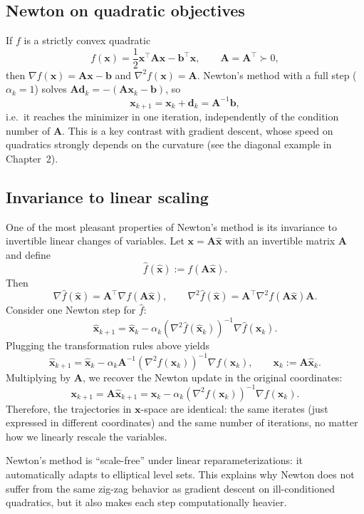 \subsection{Newton on quadratic objectives}
If $f$ is a strictly convex quadratic
\[
  f(\mathbf{x})=\frac12 \mathbf{x}^\top \mathbf{A}\mathbf{x}-\mathbf{b}^\top \mathbf{x},
  \qquad \mathbf{A}=\mathbf{A}^\top \succ 0,
\]
then $\nabla f(\mathbf{x})=\mathbf{A}\mathbf{x}-\mathbf{b}$ and
$\nabla^2 f(\mathbf{x})=\mathbf{A}$. Newton's method with a full step
($\alpha_k=1$) solves $\mathbf{A}\mathbf{d}_k=-(\mathbf{A}\mathbf{x}_k-\mathbf{b})$,
so
\[
  \mathbf{x}_{k+1}=\mathbf{x}_k+\mathbf{d}_k=\mathbf{A}^{-1}\mathbf{b},
\]
i.e.\ it reaches the minimizer in one iteration, independently of the condition
number of $\mathbf{A}$. This is a key contrast with gradient descent, whose
speed on quadratics strongly depends on the curvature (see the diagonal example
in Chapter~2).

\subsection{Invariance to linear scaling}
\label{sec:ch3-invariance}
One of the most pleasant properties of Newton's method is its invariance to
invertible linear changes of variables. Let $\mathbf{x}=\mathbf{A}\hat{\mathbf{x}}$
with an invertible matrix $\mathbf{A}$ and define
\[
  \hat f(\hat{\mathbf{x}}):= f(\mathbf{A}\hat{\mathbf{x}}).
\]
Then
\[
  \nabla \hat f(\hat{\mathbf{x}})=\mathbf{A}^\top \nabla f(\mathbf{A}\hat{\mathbf{x}}),
  \qquad
  \nabla^2 \hat f(\hat{\mathbf{x}})=\mathbf{A}^\top \nabla^2 f(\mathbf{A}\hat{\mathbf{x}})\mathbf{A}.
\]
Consider one Newton step for $\hat f$:
\[
  \hat{\mathbf{x}}_{k+1}
  =\hat{\mathbf{x}}_k-\alpha_k (\nabla^2 \hat f(\hat{\mathbf{x}}_k))^{-1}\nabla \hat f(\hat{\mathbf{x}}_k).
\]
Plugging the transformation rules above yields
\[
  \hat{\mathbf{x}}_{k+1}
  =\hat{\mathbf{x}}_k-\alpha_k \mathbf{A}^{-1}(\nabla^2 f(\mathbf{x}_k))^{-1}\nabla f(\mathbf{x}_k),
  \qquad \mathbf{x}_k:=\mathbf{A}\hat{\mathbf{x}}_k.
\]
Multiplying by $\mathbf{A}$, we recover the Newton update in the original
coordinates:
\[
  \mathbf{x}_{k+1}=\mathbf{A}\hat{\mathbf{x}}_{k+1}
  =\mathbf{x}_k-\alpha_k (\nabla^2 f(\mathbf{x}_k))^{-1}\nabla f(\mathbf{x}_k).
\]
Therefore, the trajectories in $\mathbf{x}$-space are identical: the same
iterates (just expressed in different coordinates) and the same number of
iterations, no matter how we linearly rescale the variables.

Newton's method is ``scale-free'' under linear
reparameterizations: it automatically adapts to elliptical level sets. This
explains why Newton does not suffer from the same zig-zag behavior as gradient
descent on ill-conditioned quadratics, but it also makes each step
computationally heavier.

